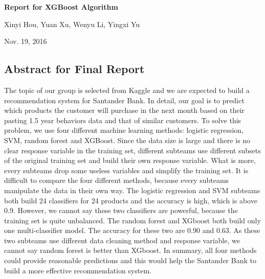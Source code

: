 \documentclass{article}
\begin{document}
\bigskip
\begin{Large}\begin{center}\textbf{Report for XGBoost Algorithm}\end{center}\end{Large}
\begin{spacing}{.75}
\begin{center}\begin{Large} Xinyi Hou, Yuan Xu, Wenyu Li, Yingxi Yu \end{Large}\end{center}
\begin{center}\begin{large}Nov. 19, 2016\end{large}\end{center}
\end{spacing}
\begin{spacing}{1.5}
\begin{large}

\section{Abstract for Final Report}
    The topic of our group is selected from Kaggle and we are expected to build a recommendation system for Santander Bank. In detail, our goal is to predict which products the customer will purchase in the next month based on their pasting 1.5 year behaviors data and that of similar customers. To solve this problem, we use four different machine learning methods: logistic regression, SVM, random forest and XGBoost. Since the data size is large and there is no clear response variable in the training set, different subteams use different subsets of the original training set and build their own response variable. What is more, every subteams drop some useless variables and simplify the training set. It is difficult to compare the four different methods, because every subteams manipulate the data in their own way. The logistic regression and SVM subteams both build 24 classifiers for 24 products and the accuracy is high, which is above 0.9. However, we cannot say these two classifiers are powerful, because the training set is quite unbalanced. The random forest and XGboost both build only one multi-classifier model. The accuracy for these two are 0.90 and 0.63. As these two subteams use different data cleaning method and response variable, we cannot say random forest is better than XGboost. In summary, all four methods could provide reasonable predictions and this would help the Santander Bank to build a more effective recommendation system.


\end{large}
\end{spacing}
\end{document}
